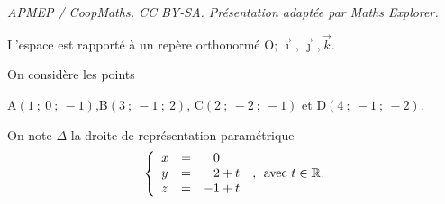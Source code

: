 \documentclass[10pt]{article}
\providecommand{\R}{\mathbb{R}}
\providecommand{\Oijk}{\(\mathrm{O};\vec{\imath},\vec{\jmath},\vec{k}\)}
\begin{document}
\noindent\textit{APMEP / CoopMaths. CC BY-SA. Présentation adaptée par Maths Explorer.}\par\medskip
\medskip

L'espace est rapporté à un repère orthonormé \Oijk.

On considère les points 
\begin{center}A$(1~;~0~;~-1)$,\quad  B$(3~;~-1~;~2)$, \quad C$(2~;~-2~;~ -1)$ \quad et \quad D$(4~;~-1~;~-2)$.\end{center}

On note $\Delta$ la droite de représentation paramétrique 
\[\left\{\begin{array}{l c l}
x &=&\phantom{-}0\\
y &=&\phantom{-}2 + t\\
z &=& -1 + t
\end{array}\right.\:,\:\: \text{avec } t\in \R.\]
\end{document}
